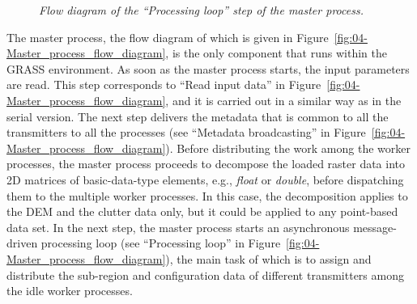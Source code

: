 \begin{figure}
\begin{minipage}[t]{0.49\textwidth}
\caption{\textit{\emph{Flow diagram of the ``Processing loop'' step of the
master process.\label{fig:04-Processing_loop_in_master_process}}}}
%
\end{minipage}
\end{figure}


The master process, the flow diagram of which is given in Figure~\ref{fig:04-Master_process_flow_diagram},
is the only component that runs within the GRASS environment. As soon
as the master process starts, the input parameters are read. This
step corresponds to ``Read input data'' in Figure~\ref{fig:04-Master_process_flow_diagram},
and it is carried out in a similar way as in the serial version. The
next step delivers the metadata that is common to all the transmitters
to all the processes (see ``Metadata broadcasting'' in Figure~\ref{fig:04-Master_process_flow_diagram}).
Before distributing the work among the worker processes, the master
process proceeds to decompose the loaded raster data into 2D matrices
of basic-data-type elements, e.g., \emph{float} or \emph{double},
before dispatching them to the multiple worker processes. In this
case, the decomposition applies to the DEM and the clutter data only,
but it could be applied to any point-based data set. In the next step,
the master process starts an asynchronous message-driven processing
loop (see ``Processing loop'' in Figure~\ref{fig:04-Master_process_flow_diagram}),
the main task of which is to assign and distribute the sub-region
and configuration data of different transmitters among the idle worker
processes.

